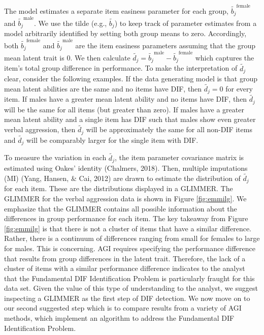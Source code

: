 \documentclass[
  english,
  man,floatsintext]{apa6}
\begin{document}
The model estimates a separate item easiness parameter for each group, \(\tilde {b_j}^\text{female}\) and \(\tilde {b_j}^\text{male}\). We use the tilde (e.g., \(\tilde {b_j}\)) to keep track of parameter estimates from a model arbitrarily identified by setting both group means to zero. Accordingly, both \(\tilde{b_j}^\text{female}\) and \(\tilde{b_j}^\text{male}\) are the item easiness parameters assuming that the group mean latent trait is \(0\). We then calculate \(\tilde{d_j} = \tilde {b_j}^\text{male} - \tilde {b_j}^\text{female}\) which captures the item's total group difference in performance. To make the interpretation of \(\tilde{d_j}\) clear, consider the following examples. If the data generating model is that group mean latent abilities are the same and no items have DIF, then \(\tilde{d_j} = 0\) for every item. If males have a greater mean latent ability and no items have DIF, then \(\tilde{d_j}\) will be the same for all items (but greater than zero). If males have a greater mean latent ability and a single item has DIF such that males show even greater verbal aggression, then \(\tilde{d_j}\) will be approximately the same for all non-DIF items and \(\tilde{d_j}\) will be comparably larger for the single item with DIF.

To measure the variation in each \(\tilde{{d_j}}\), the item parameter covariance matrix is estimated using Oakes' identity (Chalmers, 2018). Then, multiple imputations (MI) (Yang, Hansen, \& Cai, 2012) are drawn to estimate the distribution of \(\tilde{d_j}\) for each item. These are the distributions displayed in a GLIMMER. The GLIMMER for the verbal aggression data is shown in Figure \ref{fig:emmilg}. We emphasize that the GLIMMER contains all possible information about the differences in group performance for each item. The key takeaway from Figure \ref{fig:emmilg} is that there is not a cluster of items that have a similar difference. Rather, there is a continuum of differences ranging from small for females to large for males. This is concerning. AGI requires specifying the performance difference that results from group differences in the latent trait. Therefore, the lack of a cluster of items with a similar performance difference indicates to the analyst that the Fundamental DIF Identification Problem is particularly fraught for this data set. Given the value of this type of understanding to the analyst, we suggest inspecting a GLIMMER as the first step of DIF detection. We now move on to our second suggested step which is to compare results from a variety of AGI methods, which implement an algorithm to address the Fundamental DIF Identification Problem.
\end{document}
